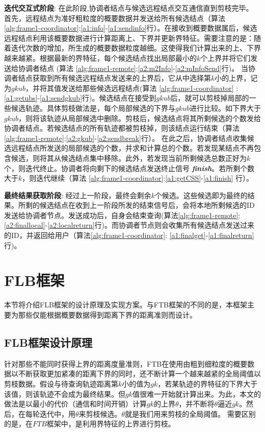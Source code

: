 \textbf{迭代交互式阶段}:  在此阶段,协调者结点与候选远程结点交互通信直到剪枝完毕。 首先，远程结点为准好粗粒度的概要数据并发送给所有候选结点（算法 \ref{alg:frame1-coordinator}:\ref{a1:info}-\ref{a1:sendinfo}行）。在接收到概要数据属后，候选远程结点利用该概要数据进行计算距离上、下界并更新界特征。需要注意的是：随着迭代次数的增加，所生成的概要数据粒度越细。这使得我们计算出来的上、下界越来越紧。根据最新的界特征，每个候选结点找出局部最小的$k$个上界并将它们发送给协调者结点 (算法 \ref{alg:frame1-remote}:\ref{a2:m2Info}-\ref{a2:mInfoSend}行)。
当协调者结点获取到所有候选远程结点发送来的上界后，它从中选择第$k$小的上界，记为$gkub$，并将其值发送给那些候选远程结点(算法 \ref{alg:frame1-coordinator} :\ref{a1:getubs}-\ref{a1:sendgkub}行)。候选结点在接受到$gkub$后，就可以剪枝掉局部的一些候选轨迹。具体剪枝做法是，每个局部候选的下界与$gkub$进行比较。如下界大于$gkub$，则将该轨迹从局部候选中删除。剪枝后，候选结点将其所剩候选的个数发给协调者结点。若候选结点的所有轨迹都被剪枝掉，则该结点运行结束（算法 \ref{alg:frame1-remote}:\ref{a2:gkub}-\ref{a2:sendbreak}行）。 在此之后，协调者结点收集候选远程结点所发送的局部候选的个数，并求和计算总的个数。若发现某结点不再包含候选，则将其从候选结点集中移除。此外，若发现当前所剩候选总数正好为$k$个，则迭代终止。协调者将向剩下的候选结点发送终止信号 \emph{\textbf{finish}}。若所剩个数大于$k$，则迭代继续（算法 \ref{alg:frame1-coordinator}:\ref{a1:getCSS}-\ref{a1:finish} 行）。

\textbf{最终结果获取阶段}: 经过上一阶段，最终会剩余$k$个候选。这些候选即为最终的结果。所剩的候选结点在收到上一阶段所发的结束信号后，会将本地所剩候选的ID发送给协调者节点。发送成功后，自身会结束查询(算法\ref{alg:frame1-remote}: \ref{a2:finallocal}-\ref{a2:localreturn}行)。而协调者节点则会收集所有候选结点发送过来的ID，并返回给用户（算法\ref{alg:frame1-coordinator}: \ref{a1:finalget}-\ref{a1:finalreturn}行)。



\section{FLB框架}\label{sec-c3-FLB}
本节将介绍FLB框架的设计原理及实现方案。与FTB框架的不同的是，本框架主要为那些仅能根据概要数据得到距离下界的距离准则而设计。
\subsection{FLB框架设计原理}
针对那些不能同时获得上界的距离度量准则，FTB在使用由粗到细粒度的概要数据以不断获取更加紧凑的距离下界的同时，还不断计算一个越来越紧的全局阈值以剪枝数据。假设与待查询轨迹距离第$k$小的值为$gk$，若某轨迹的界特征的下界大于该值，则该轨迹不会成为最终结果。但$gk$值很难一开始就计算出来。为此，本文的做法是以最小的代价（通信和时间开销）计算$gk$的上界$\theta$，并不断将$\theta$逼近$gk$。然后，在每轮迭代中，用$\theta$来剪枝候选。$\theta$就是我们用来剪枝的全局阈值。
需要区别的是，在$FTB$框架中，是利用界特征的上界进行剪枝。

